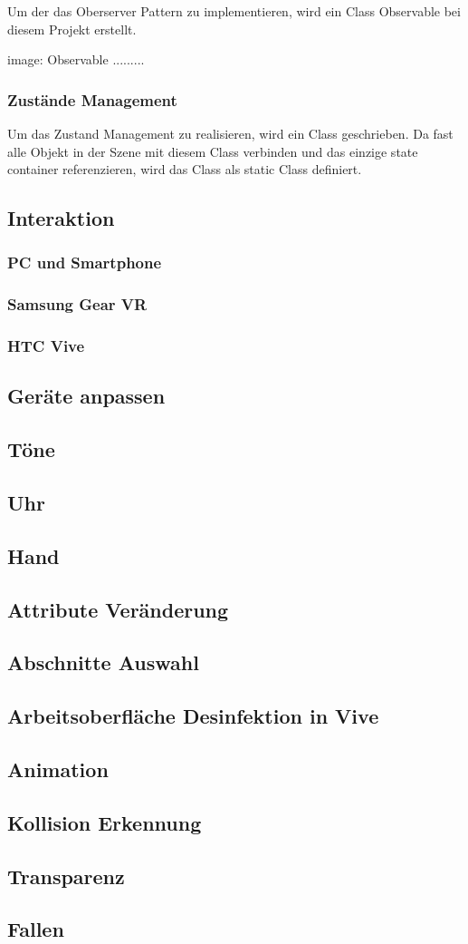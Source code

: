   Um der das Oberserver Pattern zu implementieren, wird ein Class \glqq Observable \grqq bei diesem Projekt erstellt.
  
  image: Observable .........
  
  
  \subsubsection{Zustände Management}
  
  Um das Zustand Management zu realisieren, wird ein Class geschrieben. Da fast alle Objekt in der Szene mit diesem Class verbinden und das einzige \glqq state container \grqq referenzieren, wird das Class als \glqq static \grqq Class definiert. 
 
 
 \subsection{Interaktion}
  \subsubsection{PC und Smartphone}
  \subsubsection{Samsung Gear VR}
  \subsubsection{HTC Vive}
 \subsection{Geräte anpassen}
 \subsection{Töne}
 \subsection{Uhr}
 \subsection{Hand}
 \subsection{Attribute Veränderung}
 \subsection{Abschnitte Auswahl}
 \subsection{Arbeitsoberfläche Desinfektion in Vive}
 \subsection{Animation}
 \subsection{Kollision Erkennung}
 \subsection{Transparenz}
 \subsection{Fallen}


